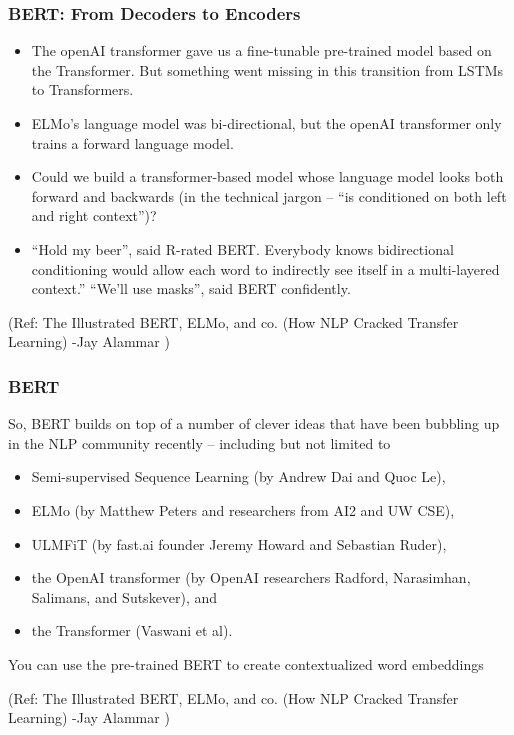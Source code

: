 \begin{frame}[fragile]\frametitle{BERT: From Decoders to Encoders}
\begin{itemize}
\item The openAI transformer gave us a fine-tunable pre-trained model based on the Transformer. But something went missing in this transition from LSTMs to Transformers. 
\item ELMo’s language model was bi-directional, but the openAI transformer only trains a forward language model. 
\item Could we build a transformer-based model whose language model looks both forward and backwards (in the technical jargon – “is conditioned on both left and right context”)?
\item 
“Hold my beer”, said R-rated BERT. Everybody knows bidirectional conditioning would allow each word to indirectly see itself in a multi-layered context.” “We’ll use masks”, said BERT confidently.
\end{itemize}


{\tiny (Ref: The Illustrated BERT, ELMo, and co. (How NLP Cracked Transfer Learning) -Jay Alammar )}
\end{frame}


\begin{frame}[fragile]\frametitle{BERT}
So, BERT builds on top of a number of clever ideas that have been bubbling up in the NLP community recently – 
including but not limited to 
\begin{itemize}
\item  Semi-supervised Sequence Learning (by Andrew Dai and Quoc Le), 
\item  ELMo (by Matthew Peters and researchers from AI2 and UW CSE), 
\item  ULMFiT (by fast.ai founder Jeremy Howard and Sebastian Ruder), 
\item  the OpenAI transformer (by OpenAI researchers Radford, Narasimhan, Salimans, and Sutskever), and 
\item  the Transformer (Vaswani et al).
\end{itemize}

You can use the pre-trained BERT to create contextualized word embeddings

{\tiny (Ref: The Illustrated BERT, ELMo, and co. (How NLP Cracked Transfer Learning) -Jay Alammar )}
\end{frame}
